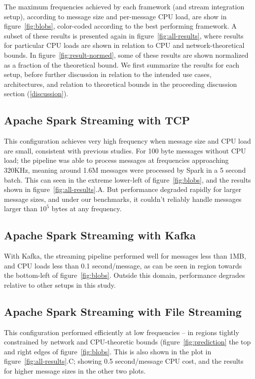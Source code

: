 \documentclass[conference]{IEEEtran}
\begin{document}
The maximum frequencies achieved by each framework (and stream integration setup), according to message size and per-message CPU load, are show in figure~\ref{fig:blobs}, color-coded according to the best performing framework. A subset of these results is presented again in figure~\ref{fig:all-results}, where results for particular CPU loads are shown in relation to CPU and network-theoretical bounds. In figure~\ref{fig:result-normed}, some of these results are shown normalized as a fraction of the theoretical bound. We first summarize the results for each setup, before further discussion in relation to the intended use cases, architectures, and relation to theoretical bounds in the proceeding discussion section (\ref{discussion}).

\subsection{Apache Spark Streaming with TCP} 
This configuration achieves very high frequency when message size and CPU load are small, consistent with previous studies. For 100 byte messages without CPU load; the pipeline was able to process messages at frequencies approaching 320KHz, meaning around 1.6M messages were processed by Spark in a 5 second batch. This can seen in the extreme lower-left of figure~\ref{fig:blobs}, and the results shown in figure~\ref{fig:all-results}.A. 
But performance degraded rapidly for larger message sizes, and under our benchmarks, it couldn't reliably handle messages larger than $10^5$ bytes at any frequency.

\subsection{Apache Spark Streaming with Kafka}
With Kafka, the streaming pipeline performed well for messages less than 1MB, and CPU loads  less than 0.1 second/message, as can be seen in region towards the bottom-left of figure~\ref{fig:blobs}. Outside this domain, performance degrades relative to other setups in this study.

\subsection{Apache Spark Streaming with File Streaming} 
This configuration performed efficiently at low frequencies -- in regions tightly constrained by network and CPU-theoretic bounds (figure~\ref{fig:prediction} the top and right edges of figure~\ref{fig:blobs}. This is also shown in the plot in figure~\ref{fig:all-results}.C; showing 0.5 second/message CPU cost, and the results for higher message sizes in the other two plots.
\end{document}
